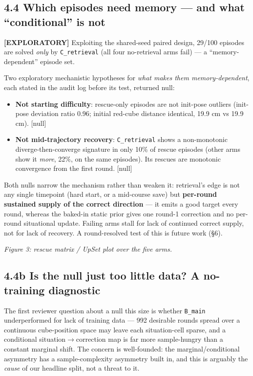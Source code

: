\subsection*{4.4 Which episodes need memory --- and what ``conditional'' is not}

\textbf{[EXPLORATORY]} Exploiting the shared-seed paired design, 29/100
episodes are solved \emph{only} by \texttt{C\_retrieval} (all four no-retrieval arms
fail) --- a ``memory-dependent'' episode set.

Two exploratory mechanistic hypotheses for \emph{what makes them
memory-dependent}, each stated in the audit log before its test,
returned null:
\begin{itemize}
\item \textbf{Not starting difficulty}: rescue-only episodes are not init-pose
  outliers (init-pose deviation ratio 0.96; initial red-cube distance
  identical, 19.9 cm vs 19.9 cm). [null]
\item \textbf{Not mid-trajectory recovery}: \texttt{C\_retrieval} shows a non-monotonic
  diverge-then-converge signature in only 10\% of rescue episodes (other
  arms show it \emph{more}, 22\%, on the same episodes). Its rescues are
  monotonic convergence from the first round. [null]
\end{itemize}

Both nulls narrow the mechanism rather than weaken it: retrieval's edge
is not any single timepoint (hard start, or a mid-course save) but
\textbf{per-round sustained supply of the correct direction} --- it emits a
good target every round, whereas the baked-in static prior gives one
round-1 correction and no per-round situational update. Failing arms
stall for lack of continued correct supply, not for lack of recovery.
A round-resolved test of this is future work (\S6).

\emph{Figure 3: rescue matrix / UpSet plot over the five arms.}

\subsection*{4.4b Is the null just too little data? A no-training diagnostic}

The first reviewer question about a null this size is whether \texttt{B\_main}
underperformed for lack of training data --- 992 desirable rounds spread
over a continuous cube-position space may leave each situation-cell
sparse, and a conditional situation$\rightarrow$correction map is far more
sample-hungry than a constant marginal shift. The concern is
well-founded: the marginal/conditional asymmetry has a sample-complexity
asymmetry built in, and this is arguably the \emph{cause} of our headline
split, not a threat to it.

